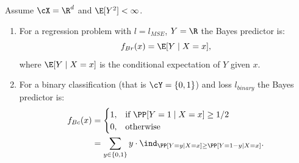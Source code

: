 \begin{proposition}\label{prop:ch2-bayes}
Assume $\cX = \R^d$ and $\E[Y^2] < \infty$.
\begin{enumerate}
  \item For a regression problem with $l = l_{MSE}$, $Y = \R$ the Bayes predictor is:
  \begin{equation}\label{eq:ch2-bayesreg}
  f_{Br}(x) = \E[Y \mid X = x],
  \end{equation}
  where $\E[Y \mid X = x]$ is the conditional expectation of $Y$ given $x$.

  \item For a binary classification (that is $\cY = \{0,1\}$) and loss $l_{binary}$ the Bayes
  predictor is:
  \begin{equation}\label{eq:ch2-bayesbin}
  \begin{aligned}
  f_{Bc}(x) &= \begin{cases} 1, & \text{if } \PP[Y = 1 \mid X = x] \ge 1/2 \\ 0, & \text{otherwise} \end{cases} \\
  &= \sum_{y \in \{0,1\}} y \cdot \ind_{\PP[Y=y \mid X=x] \ge \PP[Y = 1-y \mid X=x]}.
  \end{aligned}
  \end{equation}
\end{enumerate}
\end{proposition}

